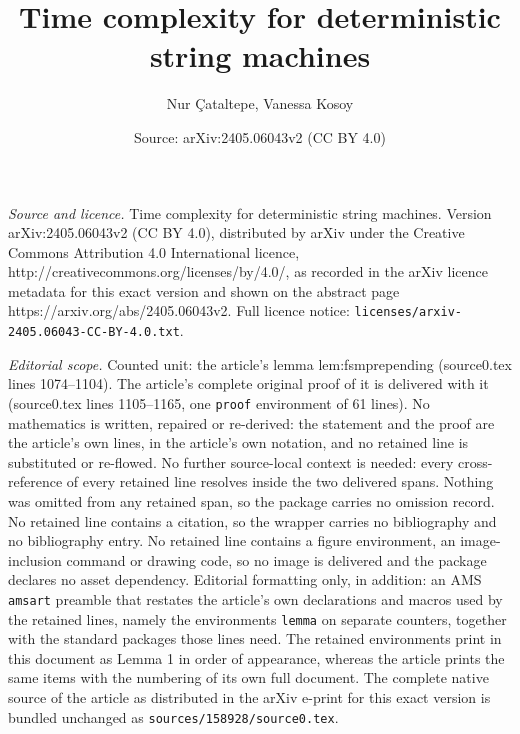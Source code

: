 \documentclass[10pt,a4paper]{amsart}
\title{Time complexity for deterministic string machines}
\author{Nur \c{C}ataltepe, Vanessa Kosoy}
\date{Source: arXiv:2405.06043v2 (CC BY 4.0)}
\begin{document}
\maketitle

\noindent\emph{Source and licence.} Time complexity for deterministic string machines. Version arXiv:2405.06043v2 (CC BY 4.0), distributed by arXiv under the Creative Commons Attribution 4.0 International licence, http://creativecommons.org/licenses/by/4.0/, as recorded in the arXiv licence metadata for this exact version and shown on the abstract page https://arxiv.org/abs/2405.06043v2. Full licence notice: \texttt{licenses/arxiv-2405.06043-CC-BY-4.0.txt}.\par\smallskip

\noindent\textit{Editorial scope.} Counted unit: the article's lemma lem:fsmprepending (source0.tex lines 1074--1104). The article's complete original proof of it is delivered with it (source0.tex lines 1105--1165, one \texttt{proof} environment of 61 lines). No mathematics is written, repaired or re-derived: the statement and the proof are the article's own lines, in the article's own notation, and no retained line is substituted or re-flowed.  No further source-local context is needed: every cross-reference of every retained line resolves inside the two delivered spans.  Nothing was omitted from any retained span, so the package carries no omission record.  No retained line contains a citation, so the wrapper carries no bibliography and no bibliography entry.  No retained line contains a figure environment, an image-inclusion command or drawing code, so no image is delivered and the package declares no asset dependency.  Editorial formatting only, in addition: an AMS \texttt{amsart} preamble that restates the article's own declarations and macros used by the retained lines, namely the environments \texttt{lemma} on separate counters, together with the standard packages those lines need.  The retained environments print in this document as Lemma 1 in order of appearance, whereas the article prints the same items with the numbering of its own full document.  The complete native source of the article as distributed in the arXiv e-print for this exact version is bundled unchanged as \texttt{sources/158928/source0.tex}.
\end{document}
